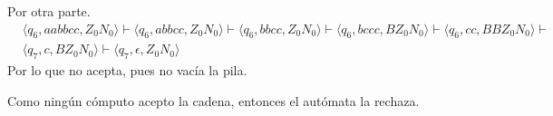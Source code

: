 \documentclass{article}
\begin{document}
\begin{enumerate}
{\begin{enumerate}
{\begin{itemize}
{				Por otra parte.
        		\begin{align*}
					&\langle q_6, aabbcc, Z_0N_0 \rangle \vdash
					\langle q_6, abbcc, Z_0N_0 \rangle \vdash
					\langle q_6, bbcc, Z_0N_0 \rangle \vdash
					\langle q_6, bccc, BZ_0N_0 \rangle \vdash
					\langle q_6, cc, BBZ_0N_0 \rangle \vdash \\
					&\langle q_7, c, BZ_0N_0 \rangle \vdash
					\langle q_7, \epsilon, Z_0N_0 \rangle
				\end{align*}
				Por lo que no acepta, pues no vacía la pila.

        		Como ningún cómputo acepto la cadena, entonces el autómata la rechaza.
        		}
        	\end{itemize}
        	}
        \end{enumerate}
    	}
    \end{enumerate}
\end{document}
